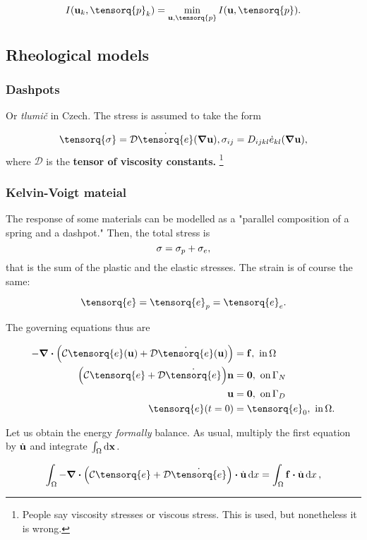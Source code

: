 \documentclass[11pt]{scrartcl} %
\begin{document}
\[
	I\qty(\vb{u}_k, \tensorq{p}_k) = \min_{\vb{u}, \tensorq{p}} I\qty(\vb{u},\tensorq{p}).
\]


\subsection{Rheological models}
\label{sec:rheology}

\subsubsection{Dashpots}
\label{sec:dashpot}
Or \textit{tlumič} in Czech. The stress is assumed to take the form

\[
	\tensorq{\sigma} = \mathcal{D}\dot{\tensorq{e}}\qty(\grad \vb{u}), \sigma_{ij} = D_{ijkl}\dot{e}_{kl}\qty(\grad \vb{u}),
\]
where $\mathcal{D}$ is the \textbf{tensor of viscosity constants.} \footnote{People say viscosity stresses or viscous stress. This is used, but nonetheless it is wrong.}

\subsubsection{Kelvin-Voigt mateial}
\label{sec:kelvin-voigt}
The response of some materials can be modelled as a "parallel composition of a spring and a dashpot." Then, the total stress is
\[
	\mathbb{\sigma} = \mathbb{\sigma}_{p} + \mathbb{\sigma}_{e},
\]
that is the sum of the plastic and the elastic stresses. The strain is of course the same:

\[
	\tensorq{e} = \tensorq{e}_{p} = \tensorq{e}_{e}.
\]

The governing equations thus are

\begin{align*}
	- \divergence{\qty(\mathcal{C} \tensorq{e}\qty(\vb{u})+ \mathcal{D}\dot{\tensorq{e}}\qty(\vb{u}))} &= \vb{f}, \, \, \text{in} \,\Omega\\
	\qty(\mathcal{C}\tensorq{e}+ \mathcal{D} \dot{\tensorq{e}})\vb{n} &= \vb{0}, \, \, \text{on} \, \Gamma_{N}\\
	\vb{u} &= \vb{0}, \, \, \text{on} \,\Gamma_D \\
	\tensorq{e}\qty(t = 0) &= \tensorq{e}_0, \, \, \text{in} \, \Omega.
\end{align*}

Let us obtain the energy \textit{formally} balance. As usual, multiply the first equation by $\dot{\vb{u}}$ and integrate $\int_{\Omega}\dd{\vb{x}}.$

\[
	\int_{\Omega}- \divergence{\qty(\mathcal{C}\tensorq{e}+ \mathcal{D}\dot{\tensorq{e}})} \vdot \dot{\vb{u}}\dd{x} = \int_{\Omega}\vb{f} \vdot \dot{\vb{u}}\dd{x},
\]
\end{document}
